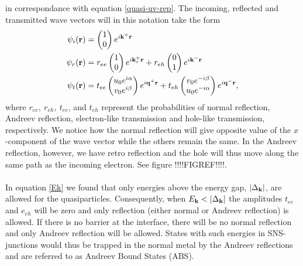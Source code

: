 in correspondance with equation \eqref{quasi-uv-rep}.
The incoming, reflected and transmitted wave vectors will in this notation take the form
\begin{equation}
\begin{split}
    \psi_i(\mathbf{r})&=\begin{pmatrix}1 \\ 0\end{pmatrix}e^{i\mathbf{k}^+\mathbf{r}}\\
    \psi_r(\mathbf{r})&=r_{ee}\begin{pmatrix}1 \\ 0\end{pmatrix}e^{i\mathbf{k}_r^+\mathbf{r}}
    + r_{eh}\begin{pmatrix}0 \\ 1\end{pmatrix}e^{i\mathbf{k}^-\mathbf{r}}\\
    \psi_t(\mathbf{r})&=t_{ee}\begin{pmatrix}u_0e^{i\alpha}\\ v_0e^{i\beta} \end{pmatrix}e^{i\mathbf{q}^+\mathbf{r}} + t_{eh} \begin{pmatrix}v_0e^{-i\beta}\\u_0e^{-i\alpha}\end{pmatrix}e^{i\mathbf{q}^-\mathbf{r}},
\end{split}
\end{equation}
where $r_{ee}, \ r_{eh}, \ t_{ee}$, and $t_{eh}$ represent the probabilities of normal reflection, Andreev reflection, electron-like transmission and hole-like transmission, respectively. We notice how the normal reflection will give opposite value of the $x$-component of the wave vector while the others remain the same. In the Andreev reflection, however, we have retro reflection and the hole will thus move along the same path as the incoming electron. See figure !!!!FIGREF!!!!.
\\
\\
In equation \eqref{Ek} we found that only energies above the energy gap, $\left|\Delta_{\mathbf{k}}\right|$, are allowed for the quasiparticles. Consequently, when $E_{\mathbf{k}}<\left|\Delta_{\mathbf{k}}\right|$ the amplitudes $t_{ee}$ and $e_{eh}$ will be zero and only reflection (either normal or Andreev reflection) is allowed. If there is no barrier at the interface, there will be no normal reflection and only Andreev reflection will be allowed. States with such energies in SNS-junctions would thus be trapped in the normal metal by the Andreev reflections and are referred to as Andreev Bound States (ABS).

